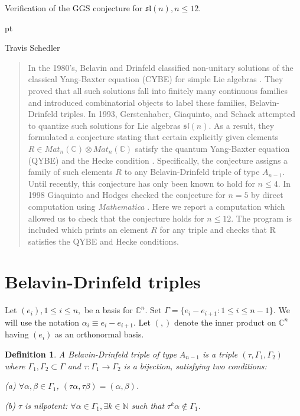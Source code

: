 \documentclass[12pt]{article}
\newtheorem{defe}{Definition}[section]
\numberwithin{equation}{section}
\begin{document}
\thispagestyle{plain}
\begin{center}
{\Large Verification of the GGS conjecture for $\mathfrak{sl}(n), n
\leq 12$.}

 pt

{\large Travis Schedler}
\end{center}
\begin{abstract}
In the 1980's, Belavin and Drinfeld classified non-unitary solutions
of the classical Yang-Baxter equation (CYBE) for simple Lie
algebras \cite{BD}.  They proved that all such solutions fall into
finitely many continuous families and introduced combinatorial objects
to label these families, Belavin-Drinfeld triples. In 1993,
Gerstenhaber, Giaquinto, and Schack attempted to quantize such
solutions for Lie algebras $\mathfrak{sl}(n).$ As a result, they
formulated a conjecture stating that certain explicitly given elements
$R \in Mat_n(\mathbb C) \otimes Mat_n(\mathbb C)$ satisfy the quantum
Yang-Baxter equation (QYBE) and the Hecke condition \cite{GGS}.
Specifically, the conjecture assigns a family of such elements $R$ to
any Belavin-Drinfeld triple of type $A_{n-1}$.  Until recently, this
conjecture has only been known to hold for $n \leq 4$.  In 1998
Giaquinto and Hodges checked the conjecture for $n=5$ by direct
computation using {\it Mathematica} \cite{GH}.  Here we report a
computation which allowed us to check that the conjecture holds for $n
\leq 12$.  The program is included which prints an element $R$ for any
triple and checks that R satisfies the QYBE and Hecke conditions.
\end{abstract}

\section{Belavin-Drinfeld triples}

Let $(e_i), 1 \leq i \leq n,$ be a basis for $\mathbb C^n$.  Set
$\Gamma = \{e_i - e_{i+1}: 1 \leq i \leq n-1\}$.  We will use the
notation $\alpha_i \equiv e_i - e_{i+1}$.  Let $( , )$ denote the
inner product on $\mathbb C^n$ having $(e_i)$ as an orthonormal basis.

\begin{defe}
A Belavin-Drinfeld triple of type $A_{n-1}$ is a triple 
$(\tau, \Gamma_1, \Gamma_2)$ where $\Gamma_1, \Gamma_2 \subset \Gamma$
and $\tau: \Gamma_1 \rightarrow \Gamma_2$ is a bijection, satisfying
two conditions:

(a) $\forall \alpha, \beta
\in \Gamma_1$, $(\tau \alpha,\tau \beta) = (\alpha, \beta)$.

(b) $\tau$ is nilpotent: $\forall \alpha \in \Gamma_1, \exists k
\in \mathbb N$ such that $\tau^k \alpha \notin \Gamma_1$.
\end{defe}
\end{document}
